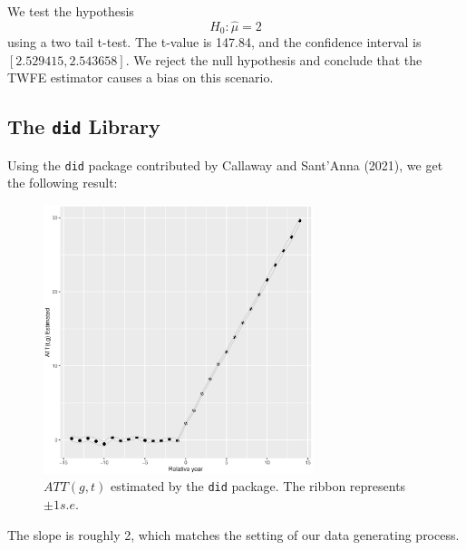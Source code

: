 We test the hypothesis
\begin{equation*}
    H_0 : \hat{\mu} = 2
\end{equation*}
using a two tail t-test. The t-value is 147.84, and the confidence interval is $[2.529415,2.543658]$. 
We reject the null hypothesis and conclude that the TWFE estimator causes a bias on this scenario.


\subsection{The \texttt{did} Library}
Using the \verb|did| package contributed by Callaway and Sant’Anna (2021), we get the following result:

\begin{figure}[h]
    \centering
    \includegraphics[width=0.7\textwidth]{fig/did_package_result.eps}
    \caption{$ATT(g,t)$ estimated by the \texttt{did} package. The ribbon represents $\pm 1 s.e$.}
\end{figure}

The slope is roughly 2, which matches the setting of our data generating process.